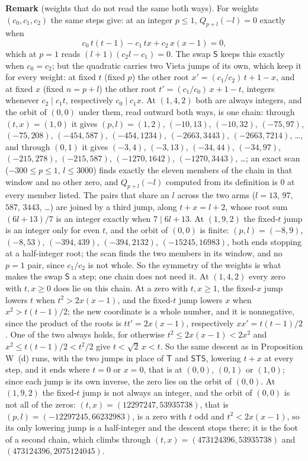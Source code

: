 \documentclass[11pt]{article}
\begin{document}
\medskip
\noindent\textbf{Remark} (weights that do not read the same both ways). For weights $(c_0,c_1,c_2)$ the same steps give: at an integer $p\le1$, $Q_{p+l}(-l)=0$ exactly when
\[
c_0\,t(t-1)-c_1\,tx+c_2\,x(x-1)=0,
\]
which at $p=1$ reads $(l+1)(c_2l-c_1)=0$. The swap $\mathsf{S}$ keeps this exactly when $c_0=c_2$; but the quadratic carries two Vieta jumps of its own, which keep it for every weight: at fixed $t$ (fixed $p$) the other root $x'=(c_1/c_2)\,t+1-x$, and at fixed $x$ (fixed $n=p+l$) the other root $t'=(c_1/c_0)\,x+1-t$, integers whenever $c_2\mid c_1t$, respectively $c_0\mid c_1x$. At $(1,4,2)$ both are always integers, and the orbit of $(0,0)$ under them, read outward both ways, is one chain: through $(t,x)=(1,0)$ it gives $(p,l)=(1,2)$, $(-10,13)$, $(-10,32)$, $(-75,97)$, $(-75,208)$, $(-454,587)$, $(-454,1234)$, $(-2663,3443)$, $(-2663,7214)$, \dots, and through $(0,1)$ it gives $(-3,4)$, $(-3,13)$, $(-34,44)$, $(-34,97)$, $(-215,278)$, $(-215,587)$, $(-1270,1642)$, $(-1270,3443)$, \dots; an exact scan ($-300\le p\le1$, $l\le3000$) finds exactly the eleven members of the chain in that window and no other zero, and $Q_{p+l}(-l)$ computed from its definition is $0$ at every member listed. The pairs that share an $l$ across the two arms ($l=13$, $97$, $587$, $3443$, \dots) are joined by a third jump, along $t+x=l+2$, whose root sum $(6l+13)/7$ is an integer exactly when $7\mid6l+13$. At $(1,9,2)$ the fixed-$t$ jump is an integer only for even $t$, and the orbit of $(0,0)$ is finite: $(p,l)=(-8,9)$, $(-8,53)$, $(-394,439)$, $(-394,2132)$, $(-15245,16983)$, both ends stopping at a half-integer root; the scan finds the two members in its window, and no $p=1$ pair, since $c_1/c_2$ is not whole. So the symmetry of the weights is what makes the swap $\mathsf{S}$ a step; one chain does not need it. At $(1,4,2)$ every zero with $t,x\ge0$ does lie on this chain. At a zero with $t,x\ge1$, the fixed-$x$ jump lowers $t$ when $t^2>2x(x-1)$, and the fixed-$t$ jump lowers $x$ when $x^2>t(t-1)/2$; the new coordinate is a whole number, and it is nonnegative, since the product of the roots is $tt'=2x(x-1)$, respectively $xx'=t(t-1)/2$. One of the two always holds, for otherwise $t^2\le2x(x-1)<2x^2$ and $x^2\le t(t-1)/2<t^2/2$ give $t<\sqrt2\,x<t$. So the same descent as in Proposition W~(d) runs, with the two jumps in place of $\mathsf{T}$ and $\mathsf{S}\mathsf{T}\mathsf{S}$, lowering $t+x$ at every step, and it ends where $t=0$ or $x=0$, that is at $(0,0)$, $(0,1)$ or $(1,0)$; since each jump is its own inverse, the zero lies on the orbit of $(0,0)$. At $(1,9,2)$ the fixed-$t$ jump is not always an integer, and the orbit of $(0,0)$ is not all of the zeros: $(t,x)=(12297247,53935738)$, that is $(p,l)=(-12297245,66232983)$, is a zero with $t$ odd and $t^2<2x(x-1)$, so its only lowering jump is a half-integer and the descent stops there; it is the foot of a second chain, which climbs through $(t,x)=(473124396,53935738)$ and $(473124396,2075124045)$.
\end{document}
